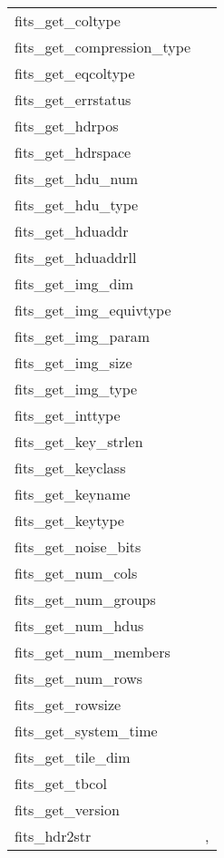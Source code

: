 \documentclass[11pt]{book}
\begin{document}
\begin{tabular}{lr}
fits\_get\_coltype    & \pageref{ffgtcl} \\
fits\_get\_compression\_type & \pageref{ffgetcomp} \\
fits\_get\_eqcoltype    & \pageref{ffgtcl} \\
fits\_get\_errstatus  & \pageref{ffgerr} \\
fits\_get\_hdrpos        & \pageref{ffghps} \\
fits\_get\_hdrspace      & \pageref{ffghsp} \\
fits\_get\_hdu\_num    & \pageref{ffghdn} \\
fits\_get\_hdu\_type   & \pageref{ffghdt} \\
fits\_get\_hduaddr    & \pageref{ffghad} \\
fits\_get\_hduaddrll    & \pageref{ffghad} \\
fits\_get\_img\_dim & \pageref{ffgidm} \\
fits\_get\_img\_equivtype & \pageref{ffgidt} \\
fits\_get\_img\_param & \pageref{ffgipr} \\
fits\_get\_img\_size & \pageref{ffgisz} \\
fits\_get\_img\_type & \pageref{ffgidt} \\
fits\_get\_inttype    & \pageref{ffinttyp} \\
fits\_get\_key\_strlen & \pageref{ffgksl} \\
fits\_get\_keyclass    & \pageref{ffgkcl} \\
fits\_get\_keyname    & \pageref{ffgknm} \\
fits\_get\_keytype    & \pageref{ffdtyp} \\
fits\_get\_noise\_bits   & \pageref{ffgetcomp} \\
fits\_get\_num\_cols     & \pageref{ffgnrw} \\
fits\_get\_num\_groups  & \pageref{ffgmng} \\
fits\_get\_num\_hdus   & \pageref{ffthdu} \\
fits\_get\_num\_members  & \pageref{ffgtnm} \\
fits\_get\_num\_rows     & \pageref{ffgnrw} \\
fits\_get\_rowsize    & \pageref{ffgrsz} \\
fits\_get\_system\_time  & \pageref{ffdt2s} \\
fits\_get\_tile\_dim     & \pageref{ffgetcomp} \\
fits\_get\_tbcol      & \pageref{ffgabc} \\
fits\_get\_version    & \pageref{ffvers} \\
fits\_hdr2str         & \pageref{ffhdr2str}, \pageref{hdr2str} \\
\end{tabular}
\end{document}
